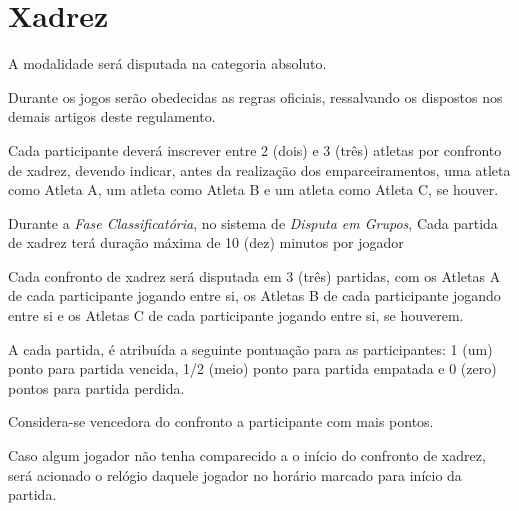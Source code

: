 {\let\clearpage\relax \chapter{Xadrez}}

\begin{article}
	A modalidade será disputada na categoria absoluto.
\end{article}

\begin{article}
	Durante os jogos serão obedecidas as regras oficiais, ressalvando os dispostos nos demais artigos deste regulamento.
\end{article}

\begin{article}
	Cada participante deverá inscrever entre 2 (dois) e 3 (três) atletas por confronto de xadrez, devendo indicar, antes da realização dos emparceiramentos, uma atleta como Atleta A, um atleta como Atleta B e um atleta como Atleta C, se houver.
\end{article}

\begin{article}
	Durante a \textit{Fase Classificatória}, no sistema de \textit{Disputa em Grupos}, Cada partida de xadrez terá duração máxima de 10 (dez) minutos por jogador
\end{article}

\begin{article}
	Cada confronto de xadrez será disputada em 3 (três) partidas, com os Atletas A de cada participante jogando entre si, os Atletas B de cada participante jogando entre si e os Atletas C de cada participante jogando entre si, se houverem.

	\begin{xparagraph}
		A cada partida, é atribuída a seguinte pontuação para as participantes: 1 (um) ponto para partida vencida, 1/2 (meio) ponto para partida empatada e 0 (zero) pontos para partida perdida.
	\end{xparagraph}

	\begin{xparagraph}
		Considera-se vencedora do confronto a participante com mais pontos.
	\end{xparagraph}

	\begin{xparagraph}
		Caso algum jogador não tenha comparecido a o início do confronto de xadrez, será acionado o relógio daquele jogador no horário marcado para início da partida.
	\end{xparagraph}
\end{article}

